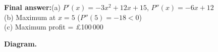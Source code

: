 \documentclass[11pt]{article}
\begin{document}
\begin{answerbox}
\textbf{Final answer:}\quad (a) \(\displaystyle  P'(x) = -3x^2+12x+15 \), \(\displaystyle  P''(x) = -6x+12 \) \\[3pt]  (b) Maximum at \(\displaystyle  x = 5 \) (\(\displaystyle  P''(5) = -18 < 0 \)) \\[3pt]  (c) Maximum profit = \pounds 100\,000
\end{answerbox}
\textbf{Diagram.}

\begin{center}
\end{center}
\end{document}
